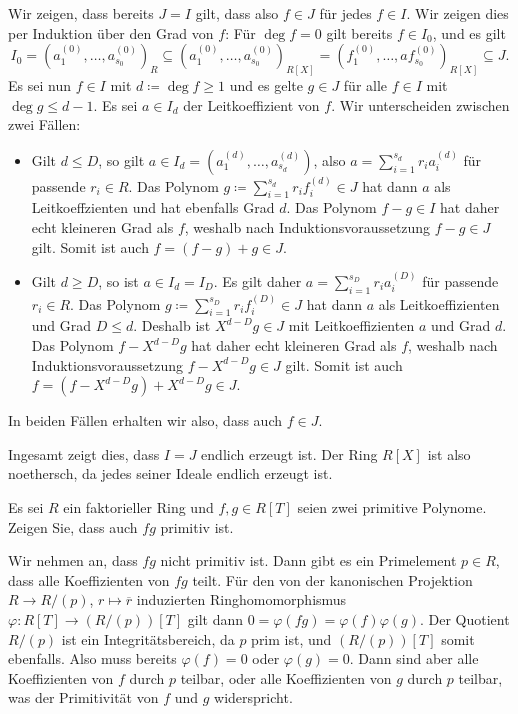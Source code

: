 \begin{question}
  Wir zeigen, dass bereits $J = I$ gilt, dass also $f \in J$ für jedes $f \in I$.
  Wir zeigen dies per Induktion über den Grad von $f$:
  Für $\deg f = 0$ gilt bereits $f\in I_0$, und es gilt
  \[
              I_0
    =         (a^{(0)}_1, \dotsc, a^{(0)}_{s_0})_R
    \subseteq (a^{(0)}_1, \dotsc, a^{(0)}_{s_0})_{R[X]}
    =         (f^{(0)}_1, \dotsc, af^{(0)}_{s_0})_{R[X]}
    \subseteq J.
  \]
  Es sei nun $f \in I$ mit $d \coloneqq \deg f \geq 1$ und es gelte $g \in J$ für alle $f \in I$ mit $\deg g \leq d-1$.
  Es sei $a \in I_d$ der Leitkoeffizient von $f$.
  Wir unterscheiden zwischen zwei Fällen:
  \begin{itemize}
    \item
      Gilt $d \leq D$, so gilt $a \in I_d = (a^{(d)}_1, \dotsc, a^{(d)}_{s_d})$, also $a = \sum_{i=1}^{s_d} r_i a^{(d)}_i$ für passende $r_i \in R$.
      Das Polynom $g \coloneqq \sum_{i=1}^{s_d} r_i f^{(d)}_i \in J$ hat dann $a$ als Leitkoeffzienten und hat ebenfalls Grad $d$.
      Das Polynom $f - g \in I$ hat daher echt kleineren Grad als $f$, weshalb nach Induktionsvoraussetzung $f - g \in J$ gilt.
      Somit ist auch $f = (f - g) + g \in J$.
    \item
      Gilt $d \geq D$, so ist $a \in I_d = I_D$.
      Es gilt daher $a = \sum_{i=1}^{s_D} r_i a^{(D)}_i$ für passende $r_i \in R$.
      Das Polynom $g \coloneqq \sum_{i=1}^{s_D} r_i f^{(D)}_i \in J$ hat dann $a$ als Leitkoeffizienten und Grad $D \leq d$.
      Deshalb ist $X^{d-D} g \in J$ mit Leitkoeffizienten $a$ und Grad $d$.
      Das Polynom $f - X^{d-D} g$ hat daher echt kleineren Grad als $f$, weshalb nach Induktionsvoraussetzung $f - X^{d-D} g \in J$ gilt.
      Somit ist auch $f = (f - X^{d-D} g) + X^{d-D} g \in J$.
  \end{itemize}
  In beiden Fällen erhalten wir also, dass auch $f \in J$.
  
  Ingesamt zeigt dies, dass $I = J$ endlich erzeugt ist.
  Der Ring $R[X]$ ist also noethersch, da jedes seiner Ideale endlich erzeugt ist.
\end{question}


\begin{question}[subtitle = Ein Lemma von Gauß]
  Es sei $R$ ein faktorieller Ring und $f, g \in R[T]$ seien zwei primitive Polynome.
  Zeigen Sie, dass auch $fg$ primitiv ist.
\end{question}


\begin{question}
  Wir nehmen an, dass $fg$ nicht primitiv ist.
  Dann gibt es ein Primelement $p \in R$, dass alle Koeffizienten von $fg$ teilt.
  Für den von der kanonischen Projektion $R \to R/(p)$, $r \mapsto \overline{r}$ induzierten Ringhomomorphismus $\varphi \colon R[T] \to (R/(p))[T]$ gilt dann $0 = \varphi(fg) = \varphi(f) \varphi(g)$.
  Der Quotient $R/(p)$ ist ein Integritätsbereich, da $p$ prim ist, und $(R/(p))[T]$ somit ebenfalls.
  Also muss bereits $\varphi(f) = 0$ oder $\varphi(g) = 0$.
  Dann sind aber alle Koeffizienten von $f$ durch $p$ teilbar, oder alle Koeffizienten von $g$ durch $p$ teilbar, was der Primitivität von $f$ und $g$ widerspricht.
\end{question}


